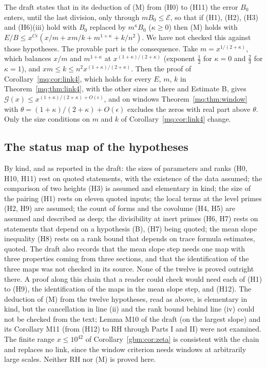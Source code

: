 \begin{remark}\label{mqc:rem:robust}
The draft states that in its deduction of (M) from (H0) to (H11) the error $B_0$ enters, until the last division, only through $mB_0\le\mathcal E$, so that if (H1), (H2), (H3) and (H6)(iii) hold with $B_0$ replaced by $m^\kappa B_0$ ($\kappa\ge0$) then (M) holds with $E/B\le x^{C\epsilon}(x/m+xm/k+m^{1+\kappa}+k/n^2)$. We have not checked this against those hypotheses. The provable part is the consequence. Take $m=x^{1/(2+\kappa)}$, which balances $x/m$ and $m^{1+\kappa}$ at $x^{(1+\kappa)/(2+\kappa)}$ (exponent $\frac12$ for $\kappa=0$ and $\frac23$ for $\kappa=1$), and $xm\le k\le n^2x^{(1+\kappa)/(2+\kappa)}$. Then the proof of Corollary~\ref{mq:cor:link4}, which holds for every $E$, $m$, $k$ in Theorem~\ref{mq:thm:link4}, with the other sizes as there and Estimate B, gives $\mathcal G(x)\le x^{(1+\kappa)/(2+\kappa)+O(\epsilon)}$, and on windows Theorem~\ref{mq:thm:window} with $\theta=(1+\kappa)/(2+\kappa)+O(\epsilon)$ excludes the zeros with real part above $\theta$. Only the size conditions on $m$ and $k$ of Corollary~\ref{mq:cor:link4} change.
\end{remark}

\subsection*{The status map of the hypotheses}

By kind, and as reported in the draft: the sizes of parameters and ranks (H0, H10, H11) rest on quoted statements, with the existence of the data assumed; the comparison of two heights (H3) is assumed and elementary in kind; the size of the pairing (H1) rests on eleven quoted inputs; the local terms at the level primes (H2, H9) are assumed; the count of forms and the covolume (H4, H5) are assumed and described as deep; the divisibility at inert primes (H6, H7) rests on statements that depend on a hypothesis (B), (H7) being quoted; the mean slope inequality (H8) rests on a rank bound that depends on trace formula estimates, quoted. The draft also records that the mean slope step needs one map with three properties coming from three sections, and that the identification of the three maps was not checked in its source. None of the twelve is proved outright there. A proof along this chain that a reader could check would need each of (H1) to (H9), the identification of the maps in the mean slope step, and (H12). The deduction of (M) from the twelve hypotheses, read as above, is elementary in kind, but the cancellation in line (ii) and the rank bound behind line (iv) could not be checked from the text; Lemma M10 of the draft (on the largest slope) and its Corollary M11 (from (H12) to RH through Parts I and II) were not examined. The finite range $x\le10^{42}$ of Corollary~\ref{gbm:cor:zeta} is consistent with the chain and replaces no link, since the window criterion needs windows at arbitrarily large scales. Neither RH nor (M) is proved here.

